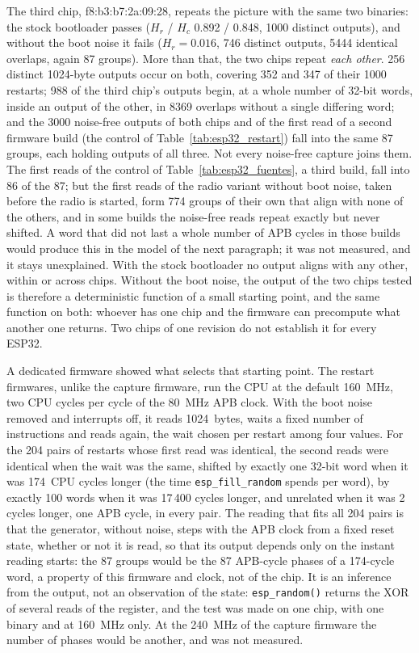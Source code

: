 The third chip, f8:b3:b7:2a:09:28, repeats the picture with the same two
binaries: the stock bootloader passes ($H_r$ / $H_c$ 0.892 / 0.848, 1000
distinct outputs), and without the boot noise it fails ($H_r = 0.016$,
746 distinct outputs, 5444 identical overlaps, again 87 groups). More
than that, the two chips repeat \emph{each other}. 256 distinct 1024-byte
outputs occur on both, covering 352 and 347 of their 1000 restarts; 988
of the third chip's outputs begin, at a whole number of 32-bit words,
inside an output of the other, in 8369 overlaps without a single
differing word; and the 3000 noise-free outputs of both chips and of the
first read of a second firmware build (the control of
Table~\ref{tab:esp32_restart}) fall into the same 87 groups, each holding outputs
of all three. Not every noise-free capture joins them. The first reads
of the control of Table~\ref{tab:esp32_fuentes}, a third build, fall
into 86 of the 87; but the first reads of the radio variant without boot
noise, taken before the radio is started, form 774 groups of their own
that align with none of the others, and in some builds the noise-free
reads repeat exactly but never shifted. A word that did not last a whole
number of APB cycles in those builds would produce this in the model of
the next paragraph; it was not measured, and it stays unexplained. With the stock bootloader no output aligns with any other,
within or across chips. Without the boot noise, the output of the two
chips tested is therefore a deterministic function of a small starting
point, and the same function on both: whoever has one chip and the
firmware can precompute what another one returns. Two chips of one
revision do not establish it for every ESP32.

A dedicated firmware showed what selects that starting point. The
restart firmwares, unlike the capture firmware, run the CPU at the
default 160~MHz, two CPU cycles per cycle of the 80~MHz APB clock. With the
boot noise removed and interrupts off, it reads 1024~bytes, waits a fixed
number of instructions and reads again, the wait chosen per restart among
four values. For the 204 pairs of restarts whose first read was
identical, the second reads were identical when the wait was the same,
shifted by exactly one 32-bit word when it was 174~CPU cycles longer
(the time \texttt{esp\_fill\_random} spends per word), by exactly 100
words when it was 17\,400 cycles longer, and unrelated when it was 2
cycles longer, one APB cycle, in every pair. The reading that fits all
204 pairs is that the generator, without
noise, steps with the APB clock from a fixed reset state, whether or not
it is read, so that its output depends only on the instant reading starts:
the 87 groups would be the 87 APB-cycle phases of a 174-cycle word, a property
of this firmware and clock, not of the chip. It is an inference from the
output, not an observation of the state: \texttt{esp\_random()} returns
the XOR of several reads of the register, and the test was made on one
chip, with one binary and at 160~MHz only. At the 240~MHz of the capture
firmware the number of phases would be another, and was not measured.

